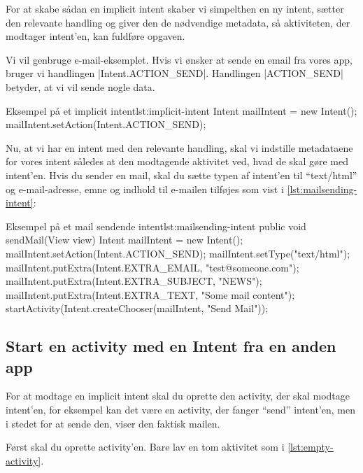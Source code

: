 For at skabe sådan en implicit intent skaber vi simpelthen en ny intent, sætter den relevante handling og giver den de nødvendige metadata, så aktiviteten, der modtager intent'en, kan fuldføre opgaven.

Vi vil genbruge e-mail-eksemplet. Hvis vi ønsker at sende en email fra vores app, bruger vi handlingen \JavaInline|Intent.ACTION_SEND|. Handlingen \JavaInline|ACTION_SEND| betyder, at vi vil sende nogle data.

\begin{example}\noindent
	\begin{JavaCode}{Eksempel på et implicit intent}{lst:implicit-intent}
		Intent mailIntent = new Intent();
		mailIntent.setAction(Intent.ACTION_SEND);
	\end{JavaCode}
\end{example}

Nu, at vi har en intent med den relevante handling, skal vi indstille metadataene for vores intent således at den modtagende aktivitet ved, hvad de skal gøre med intent'en. Hvis du sender en mail, skal du sætte typen af intent'en til ``text/html'' og e-mail-adresse, emne og indhold til e-mailen tilføjes som vist i \autoref{lst:mailsending-intent}:

\begin{example}\noindent
	\begin{JavaCode}{Eksempel på et mail sendende intent}{lst:mailsending-intent}
		public void sendMail(View view) {
			Intent mailIntent = new Intent();
			mailIntent.setAction(Intent.ACTION_SEND);
			mailIntent.setType("text/html");
			mailIntent.putExtra(Intent.EXTRA_EMAIL, "test@someone.com");
			mailIntent.putExtra(Intent.EXTRA_SUBJECT, "NEWS");
			mailIntent.putExtra(Intent.EXTRA_TEXT, "Some mail content");
			startActivity(Intent.createChooser(mailIntent, "Send Mail"));
		}
	\end{JavaCode}
\end{example}

\subsection{Start en activity med en Intent fra en anden app}

For at modtage en implicit intent skal du oprette den activity, der skal modtage intent'en, for eksempel kan det være en activity, der fanger ``send'' intent'en, men i stedet for at sende den, viser den faktisk mailen.

Først skal du oprette activity'en. Bare lav en tom aktivitet som i \autoref{lst:empty-activity}.


